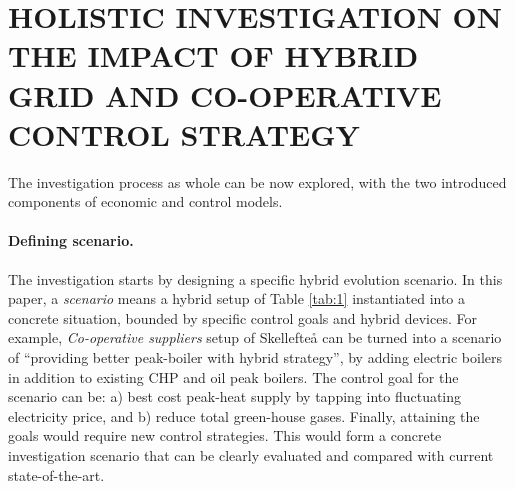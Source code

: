 \documentclass[a4paper,twoside]{article}
\begin{document}

\section{\uppercase{Holistic Investigation on the Impact of Hybrid Grid and
  Co-operative Control Strategy}}
\label{sec:hol} 
\noindent
The investigation process as whole can be now explored, with the two
introduced components of economic and control models.


\paragraph{Defining scenario.} 
\noindent
The investigation starts by designing a specific hybrid evolution
scenario. In this paper, a {\em scenario} means a hybrid setup of Table
\ref{tab:1} instantiated into a concrete situation, bounded by
specific control goals and hybrid devices. For example, {\em 
  Co-operative suppliers} setup of Skellefte{\aa} can be turned into a 
scenario of ``providing better peak-boiler with hybrid strategy'', by
adding electric boilers in addition to existing CHP and oil peak
boilers. The control goal for the scenario can be: a) best cost
peak-heat supply by tapping into fluctuating electricity price, and b)
reduce total green-house gases. Finally, attaining the goals would
require new control strategies.  
This would form a concrete investigation scenario that can be clearly
evaluated and compared with current state-of-the-art.  
\end{document}
